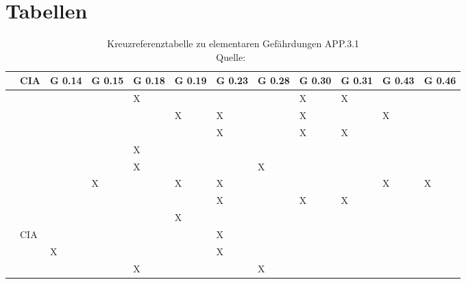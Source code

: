 

\chapter{Tabellen}\label{ch:tabellen}

	\begin{xltabular}{\textwidth}{|l|l|@{}Y@{}|@{}Y@{}|@{}Y@{}|@{}Y@{}|@{}Y@{}|@{}Y@{}|@{}Y@{}|@{}Y@{}|@{}Y@{}|@{}Y@{}|}
		\caption[Kreuzreferenztabelle APP.3.1]
		{Kreuzreferenztabelle zu elementaren Gefährdungen APP.3.1\\
		Quelle:~}
		\label{tab:kreuzreferenztabelleApp31}
		\\
		\hline
		  & CIA & G 0.14 & G 0.15 & G 0.18 & G 0.19 & G 0.23 & G 0.28 & G 0.30 & G 0.31 & G 0.43 & G 0.46
		\\\hline\hline
		\endfirsthead
		  &     &        &        & X      &        &        &        & X      & X      &        &
		\\\hline
		  &     &        &        &        & X      & X      &        & X      &        & X      &
		\\\hline
		  &     &        &        &        &        & X      &        & X      & X      &        &
		\\\hline
		  &     &        &        & X      &        &        &        &        &        &        &
		\\\hline
		  &     &        &        & X      &        &        & X      &        &        &        &
		\\\hline
		 &     &        & X      &        & X      & X      &        &        &        & X      & X
		\\\hline
		 &     &        &        &        &        & X      &        & X      & X      &        &
		\\\hline
		 &     &        &        &        & X      &        &        &        &        &        &
		\\\hline
		 & CIA &        &        &        &        & X      &        &        &        &        &
		\\\hline
		 &     & X      &        &        &        & X      &        &        &        &        &
		\\\hline
		 &     &        &        & X      &        &        & X      &        &        &        &
		\\\hline
	\end{xltabular}

